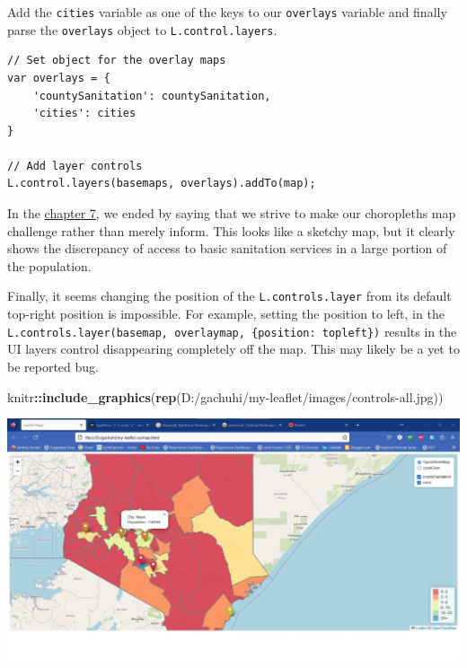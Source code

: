 \documentclass[
]{book}
\newenvironment{Shaded}{\begin{snugshade}}{\end{snugshade}}
\newcommand{\FunctionTok}[1]{\textcolor[rgb]{0.13,0.29,0.53}{\textbf{#1}}}
\newcommand{\NormalTok}[1]{#1}
\newcommand{\SpecialCharTok}[1]{\textcolor[rgb]{0.81,0.36,0.00}{\textbf{#1}}}
\newcommand{\StringTok}[1]{\textcolor[rgb]{0.31,0.60,0.02}{#1}}
\begin{document}
Add the \texttt{cities} variable as one of the keys to our \texttt{overlays} variable and finally parse the \texttt{overlays} object to \texttt{L.control.layers}.

\begin{verbatim}
// Set object for the overlay maps
var overlays = {
    'countySanitation': countySanitation,
    'cities': cities
}

// Add layer controls
L.control.layers(basemaps, overlays).addTo(map);
\end{verbatim}

In the \protect\hyperlink{creating-an-interactive-choropleth-map}{chapter 7}, we ended by saying that we strive to make our choropleths map challenge rather than merely inform. This looks like a sketchy map, but it clearly shows the discrepancy of access to basic sanitation services in a large portion of the population.

Finally, it seems changing the position of the \texttt{L.controls.layer} from its default top-right position is impossible. For example, setting the position to left, in the \texttt{L.controls.layer(basemap,\ overlaymap,\ \{position:\ \textquotesingle{}topleft\textquotesingle{}\})} results in the UI layers control disappearing completely off the map. This may likely be a yet to be reported bug.

\begin{Shaded}
\begin{Highlighting}[]
\NormalTok{knitr}\SpecialCharTok{::}\FunctionTok{include\_graphics}\NormalTok{(}\FunctionTok{rep}\NormalTok{(}\StringTok{\textquotesingle{}D:/gachuhi/my{-}leaflet/images/controls{-}all.jpg\textquotesingle{}}\NormalTok{))}
\end{Highlighting}
\end{Shaded}

\includegraphics{../images/controls-all.jpg}
\end{document}
